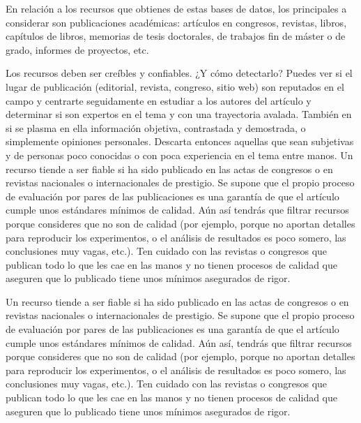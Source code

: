 En relación a los recursos que obtienes de estas bases de datos, los principales a considerar son publicaciones académicas: artículos en congresos, revistas, libros, capítulos de libros, memorias de tesis doctorales, de trabajos fin de máster o de grado, informes de proyectos, etc. 

Los recursos deben ser creíbles y confiables. ¿Y cómo detectarlo? Puedes ver si el lugar de publicación (editorial, revista, congreso, sitio web) son reputados en el campo y centrarte seguidamente en estudiar a los autores del artículo y determinar si son expertos en el tema y con una trayectoria avalada. También en si se plasma en ella información objetiva, contrastada y demostrada, o simplemente opiniones personales. Descarta entonces aquellas que sean subjetivas y de personas poco conocidas o con poca experiencia en el tema entre manos.  Un recurso tiende a ser fiable si ha sido publicado en las actas de congresos o en revistas nacionales o internacionales de prestigio. Se supone que el propio proceso de evaluación por pares de las publicaciones es una garantía de que el artículo cumple unos estándares mínimos de calidad. Aún así tendrás que filtrar recursos porque consideres que no son de calidad (por ejemplo, porque no aportan detalles para reproducir los experimentos, o el análisis de resultados es poco somero, las conclusiones muy vagas, etc.). Ten cuidado con las revistas o congresos que publican todo lo que les cae en las manos y no tienen procesos de calidad que aseguren que lo publicado tiene unos mínimos asegurados de rigor.

Un recurso tiende a ser fiable si ha sido publicado en las actas de congresos o en revistas nacionales o internacionales de prestigio. Se supone que el propio proceso de evaluación por pares de las publicaciones es una garantía de que el artículo cumple unos estándares mínimos de calidad. Aún así, tendrás que filtrar recursos porque consideres que no son de calidad (por ejemplo, porque no aportan detalles para reproducir los experimentos, o el análisis de resultados es poco somero, las conclusiones muy vagas, etc.). Ten cuidado con las revistas o congresos que publican todo lo que les cae en las manos y no tienen procesos de calidad que aseguren que lo publicado tiene unos mínimos asegurados de rigor.


